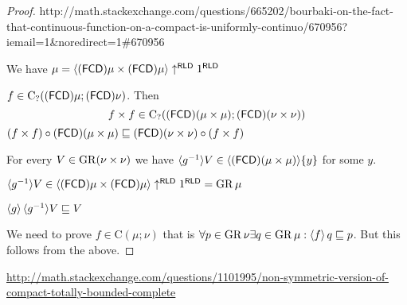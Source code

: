 \begin{proof}

http://math.stackexchange.com/questions/665202/bourbaki-on-the-fact-that-continuous-function-on-a-compact-is-uniformly-continuo/670956?iemail=1\&noredirect=1\#670956

We have $\mu= \langle (\mathsf{FCD}) \mu \times
(\mathsf{FCD}) \mu \rangle \uparrow^{\mathsf{RLD}} 1^{\mathsf{RLD}}$

$f \in \mathrm{C}_? ((\mathsf{FCD}) \mu; (\mathsf{FCD})
\nu)$. Then
\[ f \times f \in \mathrm{C}_? ((\mathsf{FCD}) (\mu \times
   \mu) ; (\mathsf{FCD}) (\nu \times \nu)) \]
$(f \times f) \circ (\mathsf{FCD}) (\mu \times \mu)
\sqsubseteq (\mathsf{FCD}) (\nu \times \nu) \circ (f \times f)$

For every $V \in \operatorname{GR} (\nu \times \nu)$ we have $\langle g^{- 1} \rangle
V \in \langle (\mathsf{FCD}) (\mu \times \mu) \rangle
\{ y \}$ for some $y$.

$\langle g^{- 1} \rangle V \in \langle (\mathsf{FCD}) \mu \times
(\mathsf{FCD}) \mu \rangle \uparrow^{\mathsf{RLD}} 1^{\mathsf{RLD}}
= \operatorname{GR} \mu$

$\left\langle g\right\rangle \langle g^{- 1} \rangle V \sqsubseteq V$

We need to prove $f \in \mathrm{C} (\mu; \nu)$ that is $\forall p \in
\operatorname{GR} \nu \exists q \in \operatorname{GR} \mu: \left\langle f\right\rangle q
\sqsubseteq p$. But this follows from the above.
\end{proof}


\url{http://math.stackexchange.com/questions/1101995/non-symmetric-version-of-compact-totally-bounded-complete}